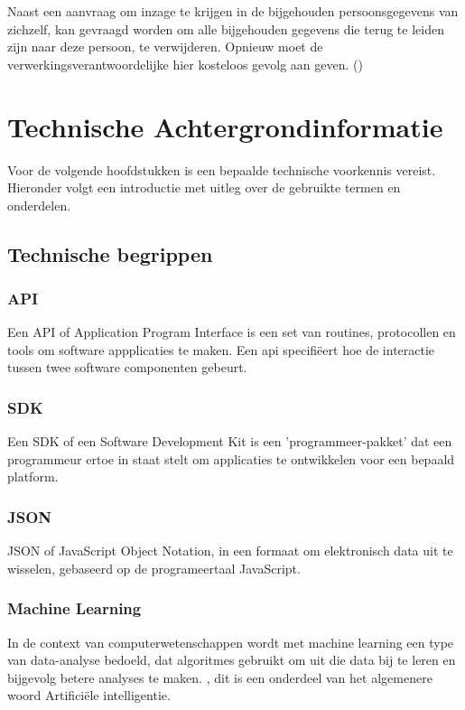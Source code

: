 Naast een aanvraag om inzage te krijgen in de bijgehouden persoonsgegevens van zichzelf, kan gevraagd worden om alle bijgehouden gegevens die terug te leiden zijn naar deze persoon, te verwijderen. Opnieuw moet de verwerkingsverantwoordelijke hier kosteloos gevolg aan geven. (\textcite{Commissie2016}) 

\section{Technische Achtergrondinformatie}
Voor de volgende hoofdstukken is een bepaalde technische voorkennis vereist. Hieronder volgt een introductie met uitleg over de gebruikte termen en onderdelen. 

\subsection{Technische begrippen}
\subsubsection{API}
Een API of Application Program Interface is een set van routines, protocollen en tools om software appplicaties te maken. Een api specifiëert hoe de interactie tussen twee software componenten gebeurt. 
\textcite{QuinStreet2019}

\subsubsection{SDK}
Een SDK of een Software Development Kit is een 'programmeer-pakket' dat een programmeur ertoe in staat stelt om applicaties te ontwikkelen voor een bepaald platform. \textcite{QuinStreet2019}

\subsubsection{JSON}
JSON of JavaScript Object Notation, in een formaat om elektronisch data uit te wisselen, gebaseerd op de programeertaal JavaScript. \textcite{QuinStreet2019}

\subsubsection{Machine Learning}
In de context van computerwetenschappen wordt met machine learning een type van data-analyse bedoeld, 
dat algoritmes gebruikt om uit die data bij te leren en bijgevolg betere analyses te maken. \textcite{QuinStreet2019}, dit is een onderdeel van het algemenere woord Artificiële intelligentie. 

